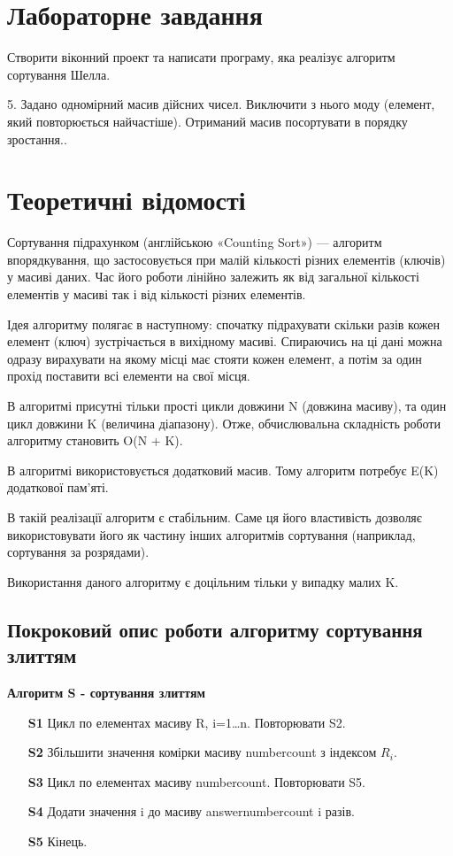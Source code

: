 \documentclass{article}
\begin{document}
\begin{normalsize}
		\section*{Лабораторне завдання}
		Створити віконний проект та написати програму, яка реалізує алгоритм сортування Шелла.
		\begin{center}
			5. Задано одномірний масив дійсних чисел. Виключити з нього моду (елемент, який повторюється найчастіше). Отриманий масив посортувати в порядку зростання..
		\end{center}
		
		\section*{Теоретичні відомості}
	Сортування підрахунком (англійською «Counting Sort») — алгоритм впорядкування, що застосовується при малій кількості різних елементів (ключів) у масиві даних. Час його роботи лінійно залежить як від загальної кількості елементів у масиві так і від кількості різних елементів.
	
	Ідея алгоритму полягає в наступному: спочатку підрахувати скільки разів кожен елемент (ключ) зустрічається в вихідному масиві. Спираючись на ці дані можна одразу вирахувати на якому місці має стояти кожен елемент, а потім за один прохід поставити всі елементи на свої місця.
	
	В алгоритмі присутні тільки прості цикли довжини N (довжина масиву), та один цикл довжини K (величина діапазону). Отже, обчислювальна складність роботи алгоритму становить O(N + K).
	
	В алгоритмі використовується додатковий масив. Тому алгоритм потребує E(K) додаткової пам’яті.
	
	В такій реалізації алгоритм є стабільним. Саме ця його властивість дозволяє використовувати його як частину інших алгоритмів сортування (наприклад, сортування за розрядами).
	
	Використання даного алгоритму є доцільним тільки у випадку малих K.
		
		\subsection*{Покроковий опис роботи алгоритму сортування злиттям}
		\textbf{Алгоритм S - сортування злиттям}
		\begin{enumerate}  
			\item [\textbf{S1}] Цикл по елементах масиву R, i=1…n. Повторювати S2.
			\item [\textbf{S2}] Збільшити значення комірки масиву numbercount з індексом $R_i$.
			\item [\textbf{S3}] Цикл по елементах масиву numbercount. Повторювати S5.
			\item [\textbf{S4}] Додати значення i до масиву answernumbercount i разів.
			\item [\textbf{S5}] Кінець.
		\end{enumerate}
		

\end{normalsize}
\end{document}
